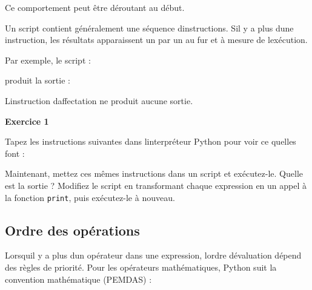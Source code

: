Ce comportement peut être déroutant au début.

Un script contient généralement une séquence
d\textquotesingle instructions. S\textquotesingle il y a plus
d\textquotesingle une instruction, les résultats apparaissent un par un
au fur et à mesure de l\textquotesingle exécution.

Par exemple, le script :

\begin{Shaded}
\begin{Highlighting}[]
\NormalTok{(}\NormalTok{)}
\OperatorTok{=} 
\end{Highlighting}
\end{Shaded}

produit la sortie :

\begin{Shaded}
\begin{Highlighting}[]
\end{Highlighting}
\end{Shaded}

L\textquotesingle instruction d\textquotesingle affectation ne produit
aucune sortie.

\textbf{Exercice 1}

Tapez les instructions suivantes dans l\textquotesingle interpréteur
Python pour voir ce qu\textquotesingle elles font :

\begin{Shaded}
\begin{Highlighting}[]
\OperatorTok{=} 
\OperatorTok{+} 
\end{Highlighting}
\end{Shaded}

Maintenant, mettez ces mêmes instructions dans un script et exécutez-le.
Quelle est la sortie ? Modifiez le script en transformant chaque
expression en un appel à la fonction \texttt{print}, puis exécutez-le à
nouveau.

\hypertarget{ordre-des-opuxe9rations}{%
\subsection{Ordre des opérations}\label{ordre-des-opuxe9rations}}

Lorsqu\textquotesingle il y a plus d\textquotesingle un opérateur dans
une expression, l\textquotesingle ordre d\textquotesingle évaluation
dépend des règles de priorité. Pour les opérateurs mathématiques, Python
suit la convention mathématique (PEMDAS) :

